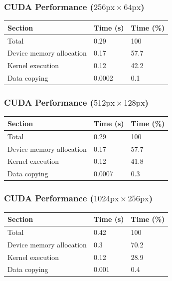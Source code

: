 \documentclass[aspectratio=169]{beamer}
\numberwithin{figure}{section}
\begin{document}
\begin{frame}
    \frametitle{CUDA Performance ($256\text{px} \times 64\text{px}$)}
    \centering\footnotesize%
    \begin{tabular}{lll}
        \textbf{Section} & \textbf{Time (s)} & \textbf{Time (\%)} \\
        \toprule
        Total & 0.29 & 100 \\
        \midrule
        Device memory allocation & 0.17 & 57.7 \\
        Kernel execution & 0.12 & 42.2 \\
        Data copying & 0.0002 & 0.1
    \end{tabular}
\end{frame}
\begin{frame}
    \frametitle{CUDA Performance ($512\text{px} \times 128\text{px}$)}
    \centering\footnotesize%
    \begin{tabular}{lll}
        \textbf{Section} & \textbf{Time (s)} & \textbf{Time (\%)} \\
        \toprule
        Total & 0.29 & 100 \\
        \midrule
        Device memory allocation & 0.17 & 57.7 \\
        Kernel execution & 0.12 & 41.8 \\
        Data copying & 0.0007 & 0.3
    \end{tabular}
\end{frame}
\begin{frame}
    \frametitle{CUDA Performance ($1024\text{px} \times 256\text{px}$)}
    \centering\footnotesize%
    \begin{tabular}{lll}
        \textbf{Section} & \textbf{Time (s)} & \textbf{Time (\%)} \\
        \toprule
        Total & 0.42 & 100 \\
        \midrule
        Device memory allocation & 0.3 & 70.2 \\
        Kernel execution & 0.12 & 28.9 \\
        Data copying & 0.001 & 0.4
    \end{tabular}
\end{frame}
\end{document}
